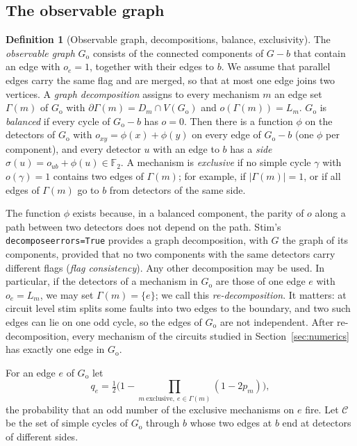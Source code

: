 \documentclass[11pt]{article}
\theoremstyle{plain}
\theoremstyle{definition}
\newtheorem{definition}{Definition}
\theoremstyle{remark}
\newcommand{\F}{\mathbb{F}_2}
\newcommand{\Go}{G_{\mathrm{o}}}
\newcommand{\cC}{\mathcal{C}}
\newcommand{\tsc}[1]{\texttt{#1}}
\renewcommand{\_}{\oldunderscore\allowbreak}
\begin{document}
\subsection{The observable graph}

\begin{definition}[Observable graph, decompositions, balance, exclusivity]\label{def:obs-graph}
The \emph{observable graph} $\Go$ consists of the connected components of $G-b$ that contain an edge with $o_e=1$, together with their edges to $b$. We assume that parallel edges carry the same flag and are merged, so that at most one edge joins two vertices.
A \emph{graph decomposition} assigns to every mechanism $m$ an edge set $\Gamma(m)$ of $\Go$ with $\partial\Gamma(m)=D_m\cap V(\Go)$ and $o(\Gamma(m))=L_m$.
$\Go$ is \emph{balanced} if every cycle of $\Go-b$ has $o=0$. Then there is a function $\phi$ on the detectors of $\Go$ with $o_{xy}=\phi(x)+\phi(y)$ on every edge of $\Go-b$ (one $\phi$ per component), and every detector $u$ with an edge to $b$ has a \emph{side} $\sigma(u)=o_{ub}+\phi(u)\in\F$.
A mechanism is \emph{exclusive} if no simple cycle $\gamma$ with $o(\gamma)=1$ contains two edges of $\Gamma(m)$; for example, if $|\Gamma(m)|=1$, or if all edges of $\Gamma(m)$ go to $b$ from detectors of the same side.
\end{definition}

The function $\phi$ exists because, in a balanced component, the parity of $o$ along a path between two detectors does not depend on the path. Stim's \tsc{decompose\_errors=True} provides a graph decomposition, with $G$ the graph of its components, provided that no two components with the same detectors carry different flags (\emph{flag consistency}). Any other decomposition may be used. In particular, if the detectors of a mechanism in $\Go$ are those of one edge $e$ with $o_e=L_m$, we may set $\Gamma(m)=\{e\}$; we call this \emph{re-decomposition}. It matters: at circuit level stim splits some faults into two edges to the boundary, and two such edges can lie on one odd cycle, so the edges of $\Go$ are not independent. After re-decomposition, every mechanism of the circuits studied in Section~\ref{sec:numerics} has exactly one edge in $\Go$.

For an edge $e$ of $\Go$ let
\[
q_e=\tfrac12\Big(1-\prod_{m\ \text{exclusive},\ e\in\Gamma(m)}(1-2p_m)\Big),
\]
the probability that an odd number of the exclusive mechanisms on $e$ fire. Let $\cC$ be the set of simple cycles of $\Go$ through $b$ whose two edges at $b$ end at detectors of different sides.
\end{document}
